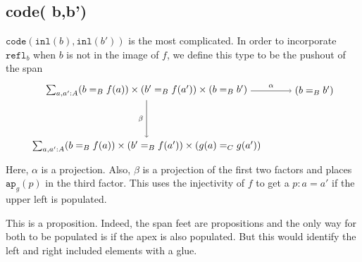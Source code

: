 \message{ !name(notes.tex)}\documentclass[12pt]{amsart}
\newcommand{\type}[1]{\mathtt{#1}}
\newcommand{\tin}{\colon}
\newcommand{\inl}{\type{inl}}
\newcommand{\code}{\type{code}}
\theoremstyle{remark}
\theoremstyle{definition}
\begin{document}
\pagebreak
\subsection*{code( b,b')}

$\code \left( \inl ( b ) , \inl( b' ) \right)$ is the most complicated. 
In order to incorporate $\type{ refl }_b$ when $b$ is not in the image of $f$, 
we define this type to be the pushout of the span
\[
\begin{tikzpicture}
	\node (1) at (0,2) 
		{ $ \sum_{ a , a' : A } 
			( b =_B f ( a ) ) 
			\times ( b' =_B f ( a' ) ) 
			\times ( b =_B b' ) $ };
	\node (2) at (6,2) 
		{ $ ( b =_B b' ) $ };
	\node (3) at (0,0) 
		{ $ \sum_{ a , a' : A } 
			( b =_B f ( a ) ) 
			\times  (b' =_B f ( a' ) ) 
			\times ( g ( a ) =_C g ( a' ) ) $ };
	\draw [ -> ] (1) to 
		node [above] {\scriptsize $ \alpha $} 
		(2);
	\draw [ -> ] (1) to 
		node [left] {\scriptsize $ \beta $}
		(3);
\end{tikzpicture}
\]
Here, $ \alpha $ is a projection. Also,
$ \beta $ is a projection of the first
two factors and places $ \type{ ap }_g (p) $ 
in the third factor. This uses the injectivity of $f$
to get a $ p \tin a = a' $ if the upper left
is populated.

This is a proposition. 
Indeed, the span feet are propositions
and the only way for both to be populated
is if the apex is also populated.
But this would identify the 
left and right included elements
with a glue.
\end{document}
